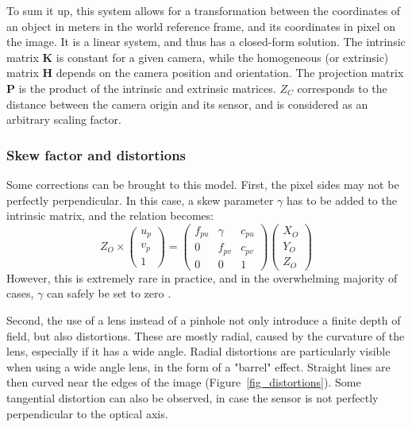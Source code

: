 To sum it up, this system allows for a transformation between the coordinates of an object in meters in the world reference frame, and its coordinates in pixel on the image. It is a linear system, and thus has a closed-form solution. The intrinsic matrix $\textbf{K}$ is constant for a given camera, while the homogeneous (or extrinsic) matrix $\textbf{H}$ depends on the camera position and orientation. The projection matrix $\textbf{P}$ is the product of the intrinsic and extrinsic matrices. $Z_C$ corresponds to the distance between the camera origin and its sensor, and is considered as an arbitrary scaling factor.


\subsubsection{Skew factor and distortions}

Some corrections can be brought to this model. First, the pixel sides may not be perfectly perpendicular. In this case, a skew parameter $\gamma$ has to be added to the intrinsic matrix, and the relation becomes:
\begin{equation}
  Z_O \times \begin{pmatrix}u_p\\v_p\\1\end{pmatrix} = \begin{pmatrix}f_{pu} & \gamma & c_{pu} \\ 0 & f_{pv} & c_{pv} \\ 0&0&1\end{pmatrix}\begin{pmatrix}X_O\\Y_O\\Z_O\end{pmatrix}
\end{equation}
However, this is extremely rare in practice, and in the overwhelming majority of cases, $\gamma$
can safely be set to zero \cite{Zhang2000}.

\vspace*{0.5cm}
Second, the use of a lens instead of a pinhole not only introduce a finite depth of field, but also distortions. These are mostly radial, caused by the curvature of the lens, especially if it has a wide angle. Radial distortions are particularly visible when using a wide angle lens, in the form of a "barrel" effect. Straight lines are then curved near the edges of the image (Figure~\ref{fig_distortions}). Some tangential distortion can also be observed, in case the sensor is not perfectly perpendicular to the optical axis. 

